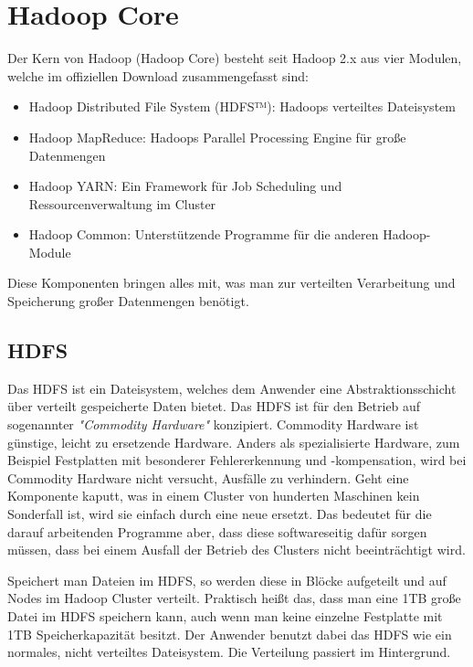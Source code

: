 \section{Hadoop Core}
Der Kern von Hadoop (Hadoop Core) besteht seit Hadoop 2.x aus vier Modulen, welche im offiziellen Download zusammengefasst sind\cite{noauthor_apache_nodate}:
\begin{itemize}
    \item Hadoop Distributed File System (HDFS™): Hadoops verteiltes Dateisystem
    \item Hadoop MapReduce: Hadoops Parallel Processing Engine für große Datenmengen
    \item Hadoop YARN: Ein Framework für Job Scheduling und Ressourcenverwaltung im Cluster
    \item Hadoop Common: Unterstützende Programme für die anderen Hadoop-Module
\end{itemize}
Diese Komponenten bringen alles mit, was man zur verteilten Verarbeitung und Speicherung großer Datenmengen benötigt. 

\subsection{HDFS}
\label{chap:fund sec:core sub:hdfs}
\par
Das HDFS ist ein Dateisystem, welches dem Anwender eine Abstraktionsschicht über verteilt gespeicherte Daten bietet. Das HDFS ist für den Betrieb auf sogenannter \textit{"Commodity Hardware"} konzipiert. Commodity Hardware ist günstige, leicht zu ersetzende Hardware. Anders als spezialisierte Hardware, zum Beispiel Festplatten mit besonderer Fehlererkennung und -kompensation, wird bei Commodity Hardware nicht versucht, Ausfälle zu verhindern. Geht eine Komponente kaputt, was in einem Cluster von hunderten Maschinen kein Sonderfall ist, wird sie einfach durch eine neue ersetzt. Das bedeutet für die darauf arbeitenden Programme aber, dass diese softwareseitig dafür sorgen müssen, dass bei einem Ausfall der Betrieb des Clusters nicht beeinträchtigt wird.\cite{white_hadoop_2015}  
\par
Speichert man Dateien im HDFS, so werden diese in Blöcke aufgeteilt und auf Nodes im Hadoop Cluster verteilt. Praktisch heißt das, dass man eine 1TB große Datei im HDFS speichern kann, auch wenn man keine einzelne Festplatte mit 1TB Speicherkapazität besitzt. Der Anwender benutzt dabei das HDFS wie ein normales, nicht verteiltes Dateisystem. Die Verteilung passiert im Hintergrund. 

